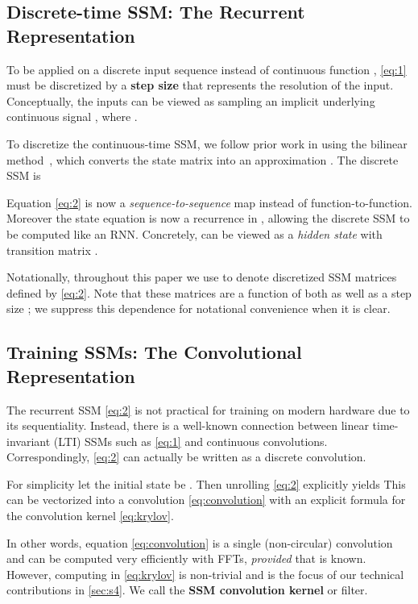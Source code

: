 \documentclass{article}
\begin{document}
\subsection{Discrete-time SSM: The Recurrent Representation}
\label{sec:ss-recurrent}

To be applied on a discrete input sequence  instead of continuous function ,
\eqref{eq:1} must be discretized by a \textbf{step size}  that represents the resolution of the input.
Conceptually, the inputs  can be viewed as sampling an implicit underlying continuous signal , where .




To discretize the continuous-time SSM, we follow prior work in using the bilinear method~\citep{tustin1947method}, which converts the state matrix  into an approximation  .
The discrete SSM is

Equation \eqref{eq:2} is now a \emph{sequence-to-sequence} map  instead of function-to-function.
Moreover the state equation is now a recurrence in ,
allowing the discrete SSM to be computed like an RNN.
Concretely,  can be viewed as a \emph{hidden state} with transition matrix .

Notationally, throughout this paper we use  to denote discretized SSM matrices defined by \eqref{eq:2}. Note that these matrices are a function of both  as well as a step size ; we suppress this dependence for notational convenience when it is clear.


\subsection{Training SSMs: The Convolutional Representation}
\label{sec:ss-convolution}

The recurrent SSM \eqref{eq:2} is not practical for training on modern hardware due to its sequentiality.
Instead,
there is a well-known connection between linear time-invariant (LTI) SSMs such as \eqref{eq:1} and continuous convolutions.
Correspondingly, \eqref{eq:2} can actually be written as a discrete convolution.

For simplicity let the initial state be .
Then unrolling \eqref{eq:2} explicitly yields 
This can be vectorized into a convolution \eqref{eq:convolution} with an explicit formula for the convolution kernel \eqref{eq:krylov}.


\normalsize
In other words, equation \eqref{eq:convolution} is a single (non-circular) convolution and can be computed very efficiently with FFTs, \emph{provided} that  is known. However, computing  in \eqref{eq:krylov} is non-trivial and is the focus of our technical contributions in \cref{sec:s4}.
We call  the \textbf{SSM convolution kernel} or filter.
 
\end{document}
